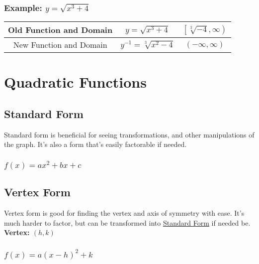 \documentclass[12pt, english]{article}
\begin{document}
	\subsubsection*{Example: $y = \sqrt{x^3+4}$}
	\begin{center}
		\begin{tabular}{|c|c|c|}
			\hline
				Old Function and Domain & $y = \sqrt{x^3+4}$ & $\left[\sqrt[3]{-4}, \infty\right)$ \\
			\hline
				New Function and Domain & $y^{-1} = \sqrt[3]{x^2-4}$ & $(-\infty, \infty)$ \\
			\hline
		\end{tabular}
	\end{center}
	\section{Quadratic Functions}
	\subsection{Standard Form}
	Standard form is beneficial for seeing transformations, and other manipulations of the graph. It's also a form that's easily factorable if needed.
	\subsubsection*{$f(x) = ax^2+bx+c$}
	\subsection{Vertex Form}
	Vertex form is good for finding the vertex and axis of symmetry with ease. It's much harder to factor, but can be transformed
	into \underline{Standard Form} if needed be. \textbf{Vertex: $(h, k)$}
	\subsubsection*{$f(x) = a(x-h)^2+k$}
\end{document}
